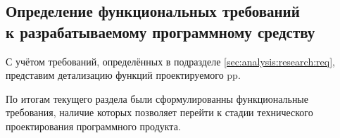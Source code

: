 \subsection{Определение функциональных требований \\ к разрабатываемому программному средству}
\label{sec:analysis:research:funcreq}

С учётом требований, определённых в подразделе \ref{sec:analysis:research:req}, представим детализацию функций проектируемого \gls{pp}.








По итогам текущего раздела были сформулированны функциональные требования, наличие которых позволяет перейти к стадии технического проектирования программного продукта.



